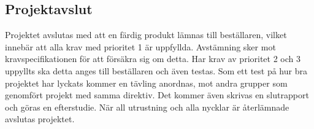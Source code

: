 \documentclass[11pt]{article}
\begin{document}
\begin{flushleft}
\section{Projektavslut}
Projektet avslutas med att en färdig produkt lämnas till beställaren, vilket innebär att alla krav med prioritet 1 är uppfyllda. Avstämning sker mot kravspecifikationen för att försäkra sig om detta. Har krav av prioritet 2 och 3 uppyllts ska detta anges till beställaren och även testas. Som ett test på hur bra projektet har lyckats kommer en tävling anordnas, mot andra grupper som genomfört projekt med samma direktiv. Det kommer även skrivas en slutrapport och göras en efterstudie. När all utrustning och alla nycklar är återlämnade avslutas projektet.

\end{flushleft}
\end{document}
